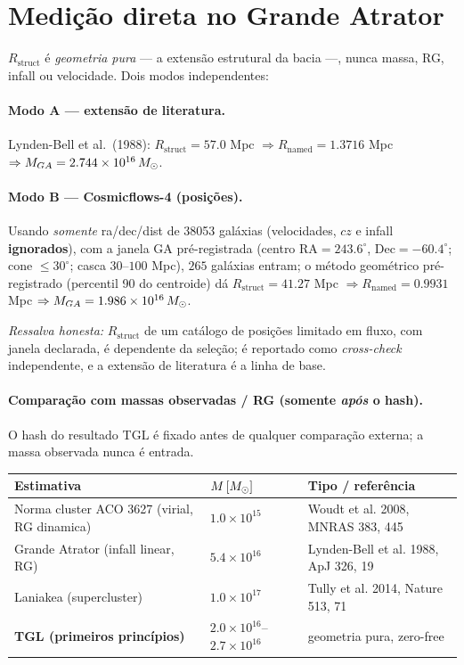 \documentclass[11pt]{article}
\theoremstyle{definition}\newtheorem{deriv}{Derivação}
\begin{document}
\section{Medição direta no Grande Atrator}

$R_{\mathrm{struct}}$ é \emph{geometria pura} --- a extensão estrutural da bacia ---, nunca massa, RG, infall ou velocidade. Dois modos independentes:

\paragraph{Modo A --- extensão de literatura.} Lynden-Bell et al.\ (1988): $R_{\mathrm{struct}}=57.0$ Mpc $\Rightarrow R_{\mathrm{named}}=1.3716$ Mpc $\Rightarrow M_{GA}=2.744\times10^{16}\,M_{\odot}$.

\paragraph{Modo B --- Cosmicflows-4 (posições).} Usando \emph{somente} ra/dec/dist de 38053 galáxias (velocidades, $cz$ e infall \textbf{ignorados}), com a janela GA pré-registrada (centro $\mathrm{RA}=243.6^\circ$, $\mathrm{Dec}=-60.4^\circ$; cone $\leq30^\circ$; casca $30$--$100$ Mpc), $265$ galáxias entram; o método geométrico pré-registrado (percentil 90 do centroide) dá $R_{\mathrm{struct}}=41.27$ Mpc $\Rightarrow R_{\mathrm{named}}=0.9931$ Mpc $\Rightarrow M_{GA}=1.986\times10^{16}\,M_{\odot}$.

\emph{Ressalva honesta:} $R_{\mathrm{struct}}$ de um catálogo de posições limitado em fluxo, com janela declarada, é dependente da seleção; é reportado como \emph{cross-check} independente, e a extensão de literatura é a linha de base.

\paragraph{Comparação com massas observadas / RG (somente \emph{após} o hash).} O hash do resultado TGL é fixado antes de qualquer comparação externa; a massa observada nunca é entrada.

\begin{center}\small\begin{tabular}{p{5.3cm}l p{5.2cm}}\toprule

Estimativa & $M\,[M_{\odot}]$ & Tipo / referência\\\midrule

Norma cluster ACO 3627 (virial, RG dinamica) & $1.0\times10^{15}$ & Woudt et al. 2008, MNRAS 383, 445\\

Grande Atrator (infall linear, RG) & $5.4\times10^{16}$ & Lynden-Bell et al. 1988, ApJ 326, 19\\

Laniakea (supercluster) & $1.0\times10^{17}$ & Tully et al. 2014, Nature 513, 71\\

\textbf{TGL (primeiros princípios)} & $2.0\times10^{16}$--$2.7\times10^{16}$ & geometria pura, zero-free\\\bottomrule

\end{tabular}\end{center}
\end{document}
